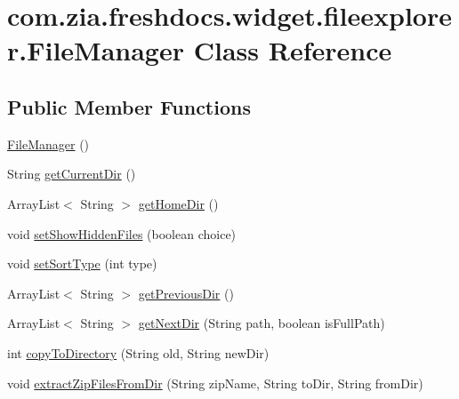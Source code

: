 \hypertarget{classcom_1_1zia_1_1freshdocs_1_1widget_1_1fileexplorer_1_1_file_manager}{\section{com.\-zia.\-freshdocs.\-widget.\-fileexplorer.\-File\-Manager Class Reference}
\label{classcom_1_1zia_1_1freshdocs_1_1widget_1_1fileexplorer_1_1_file_manager}
}
\subsection*{Public Member Functions}
\begin{DoxyCompactItemize}
\item 
\hyperlink{classcom_1_1zia_1_1freshdocs_1_1widget_1_1fileexplorer_1_1_file_manager_a851c9b7d58ef83cd4bae907f0aac91eb}{File\-Manager} ()
\item 
String \hyperlink{classcom_1_1zia_1_1freshdocs_1_1widget_1_1fileexplorer_1_1_file_manager_ae1e732b9736be60e16c21f3a802e44d8}{get\-Current\-Dir} ()
\item 
Array\-List$<$ String $>$ \hyperlink{classcom_1_1zia_1_1freshdocs_1_1widget_1_1fileexplorer_1_1_file_manager_ac278b53c29aa81d216c6d8d791016106}{get\-Home\-Dir} ()
\item 
void \hyperlink{classcom_1_1zia_1_1freshdocs_1_1widget_1_1fileexplorer_1_1_file_manager_ace41ce68b6b7ad5ff469e76f46ccdcd0}{set\-Show\-Hidden\-Files} (boolean choice)
\item 
void \hyperlink{classcom_1_1zia_1_1freshdocs_1_1widget_1_1fileexplorer_1_1_file_manager_a14f9e7e1b359468c82c4fd64500e13d8}{set\-Sort\-Type} (int type)
\item 
Array\-List$<$ String $>$ \hyperlink{classcom_1_1zia_1_1freshdocs_1_1widget_1_1fileexplorer_1_1_file_manager_ae1a8d103fa5dbfade39ca0e071da3eed}{get\-Previous\-Dir} ()
\item 
Array\-List$<$ String $>$ \hyperlink{classcom_1_1zia_1_1freshdocs_1_1widget_1_1fileexplorer_1_1_file_manager_a68b8361912dc1a3de41ce7b2a8975a7c}{get\-Next\-Dir} (String path, boolean is\-Full\-Path)
\item 
int \hyperlink{classcom_1_1zia_1_1freshdocs_1_1widget_1_1fileexplorer_1_1_file_manager_a1e688cf72bb5e16c2e8da77e0028776e}{copy\-To\-Directory} (String old, String new\-Dir)
\item 
void \hyperlink{classcom_1_1zia_1_1freshdocs_1_1widget_1_1fileexplorer_1_1_file_manager_a1504afeed0e897aa0ce249e62ef44592}{extract\-Zip\-Files\-From\-Dir} (String zip\-Name, String to\-Dir, String from\-Dir)

\end{DoxyCompactItemize}
